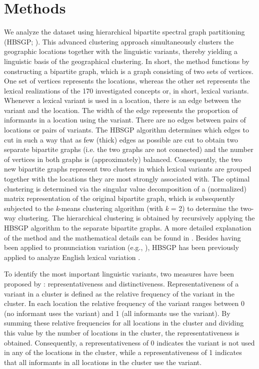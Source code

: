 \documentclass[output=paper]{LSP/langsci}
\begin{document}
\section{Methods}
We analyze the dataset using hierarchical bipartite spectral graph partitioning (HBSGP; \citealt{wieling_bipartite_2011}). This advanced clustering approach simultaneously clusters the geographic locations together with the linguistic variants, thereby yielding a linguistic basis of the geographical clustering. In short, the method functions by constructing a bipartite graph, which is a graph consisting of two sets of vertices. One set of vertices represents the locations, whereas the other set represents the lexical realizations of the 170 investigated concepts or, in short, lexical variants. Whenever a lexical variant is used in a location, there is an edge between the variant and the location. The width of the edge represents the proportion of informants in a location using the variant. There are no edges between pairs of locations or pairs of variants. The HBSGP  algorithm determines which edges to cut in such a way that as few (thick) edges as possible are cut to obtain two separate bipartite graphs (i.e. the two graphs are not connected) and the number of vertices in both graphs is (approximately) balanced. Consequently, the two new bipartite graphs represent two clusters in which lexical variants are grouped together with the locations they are most strongly associated with. The optimal clustering is determined via the singular value decomposition of a (normalized) matrix representation of the original bipartite graph, which is subsequently subjected to the \textit{k}{}-means clustering algorithm (with \textit{k} = 2) to determine the two-way clustering. The hierarchical clustering is obtained by recursively applying the HBSGP algorithm to the separate bipartite graphs. A more detailed explanation of the method and the mathematical details can be found in \citet{wieling_bipartite_2011}. Besides having been applied to pronunciation variation (e.g., \citealt{wieling_bipartite_2011}), HBSGP has been previously applied to analyze English lexical variation \citep{wieling_analyzing_2014}. 

To identify the most important linguistic variants, two measures have been proposed by \citet{wieling_bipartite_2011}: representativeness and distinctiveness. Representativeness of a variant in a cluster is defined as the relative frequency of the variant in the cluster. In each location the relative frequency of the variant ranges between 0 (no informant uses the variant) and 1 (all informants use the variant). By summing these relative frequencies for all locations in the cluster and dividing this value by the number of locations in the cluster, the representativeness is obtained. Consequently, a representativeness of 0 indicates the variant is not used in any of the locations in the cluster, while a representativeness of 1 indicates that all informants in all locations in the cluster use the variant. 
\end{document}
